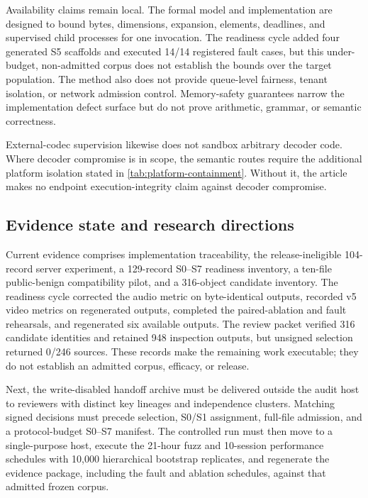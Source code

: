 Availability claims remain local. The formal model and implementation are
designed to bound bytes, dimensions, expansion, elements, deadlines, and
supervised child processes for one invocation. The readiness cycle added four
generated S5 scaffolds and executed 14/14 registered fault cases, but this
under-budget, non-admitted corpus does not establish the bounds over the target
population. The method also does not provide queue-level fairness, tenant
isolation, or network admission control. Memory-safety guarantees narrow the
implementation defect surface but do not prove arithmetic, grammar, or semantic
correctness.

External-codec supervision likewise does not sandbox arbitrary decoder code.
Where decoder compromise is in scope, the semantic routes require the additional
platform isolation stated in \cref{tab:platform-containment}. Without it, the
article makes no endpoint execution-integrity claim against decoder compromise.

\subsection{Evidence state and research directions}

Current evidence comprises implementation traceability, the release-ineligible
104-record server experiment, a 129-record S0--S7 readiness inventory, a
ten-file public-benign compatibility pilot, and a 316-object candidate
inventory. The readiness cycle corrected the audio metric on byte-identical
outputs, recorded v5 video metrics on regenerated outputs, completed the
paired-ablation and fault rehearsals, and regenerated six available outputs.
The review packet verified 316 candidate identities and retained 948 inspection
outputs, but unsigned selection returned 0/246 sources. These records make the
remaining work executable; they do not establish an admitted corpus, efficacy,
or release.

Next, the write-disabled handoff archive must be delivered outside the audit
host to reviewers with distinct key lineages and independence clusters.
Matching signed decisions must precede selection, S0/S1 assignment, full-file
admission, and a protocol-budget S0--S7 manifest. The controlled run must then
move to a single-purpose host, execute the 21-hour fuzz and 10-session
performance schedules with 10,000 hierarchical bootstrap replicates, and
regenerate the evidence package, including the fault and ablation schedules,
against that admitted frozen corpus.
